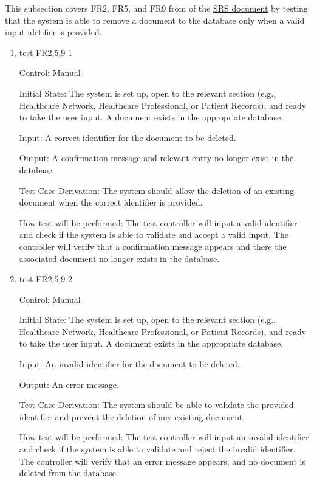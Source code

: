 \documentclass[12pt, titlepage]{article}
\begin{document}
This subsection covers FR2, FR5, and FR9 from of the \href{https://github.com/Inreet-Kaur/capstone/blob/main/docs/SRS/SRS.pdf}{SRS document} \citep{SRS} by testing that the system is able to remove a document to the database only when a valid input idetifier is provided.

\begin{enumerate}

\item{test-FR2,5,9-1} \label{test-FR2,5,9-1}

Control: Manual

Initial State: The system is set up, open to the relevant section (e.g., Healthcare Network, Healthcare Professional, or Patient Records), and ready to take the user input. A document exists in the appropriate database.

Input: A correct identifier for the document to be deleted.

Output: A confirmation message and relevant entry no longer exist in the database.

Test Case Derivation: The system should allow the deletion of an existing document when the correct identifier is provided. 

How test will be performed: The test controller will input a valid identifier and check if the system is able to validate and accept a valid input. The controller will verify that a confirmation message appears and there the associated document no longer exists in the database.

					
\item{test-FR2,5,9-2} \label{test-FR2,5,9-2}

Control: Manual

Initial State: The system is set up, open to the relevant section (e.g., Healthcare Network, Healthcare Professional, or Patient Records), and ready to take the user input. A document exists in the appropriate database.

Input: An invalid identifier for the document to be deleted.

Output: An error message.

Test Case Derivation: The system should be able to validate the provided identifier and prevent the deletion of any existing document. 

How test will be performed: The test controller will input an invalid identifier and check if the system is able to validate and reject the invalid identifier. The controller will verify that an error message appears, and no document is deleted from the database.

\end{enumerate}
\end{document}
